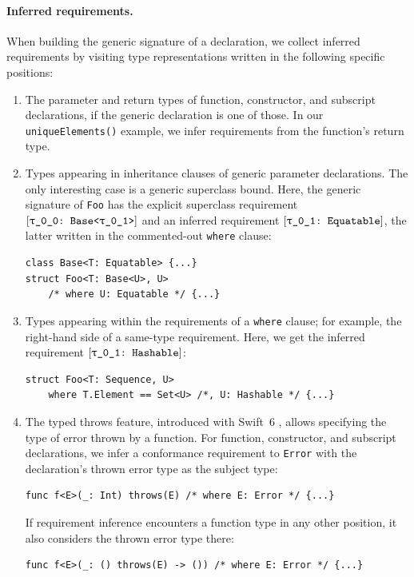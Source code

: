 \documentclass[../generics]{subfiles}
\begin{document}
\paragraph{Inferred requirements.} When building the generic signature of a declaration, we collect inferred requirements by visiting type representations written in the following specific positions:
\begin{enumerate}
\item The parameter and return types of function, constructor, and subscript declarations, if the generic declaration is one of those. In our \texttt{uniqueElements()} example, we infer requirements from the function's return type.

\item Types appearing in inheritance clauses of generic parameter declarations. The only interesting case is a generic superclass bound. Here, the generic signature of \texttt{Foo} has the explicit superclass requirement $\ConfReq{\rT}{Base<\rU>}$ and an inferred requirement $\ConfReq{\rU}{Equatable}$, the latter written in the commented-out \texttt{where} clause:
\begin{Verbatim}
class Base<T: Equatable> {...}
struct Foo<T: Base<U>, U>
    /* where U: Equatable */ {...}
\end{Verbatim}

\item Types appearing within the requirements of a \texttt{where} clause; for example, the right-hand side of a same-type requirement. Here, we get the inferred requirement $\ConfReq{\rU}{Hashable}$:
\begin{Verbatim}
struct Foo<T: Sequence, U>
    where T.Element == Set<U> /*, U: Hashable */ {...}
\end{Verbatim}

\item The typed throws feature, introduced with Swift~6 \cite{se0413}, allows specifying the type of error thrown by a function. For function, constructor, and subscript declarations, we infer a conformance requirement to \texttt{Error} with the declaration's thrown error type as the subject type:
\begin{Verbatim}
func f<E>(_: Int) throws(E) /* where E: Error */ {...}
\end{Verbatim}
If requirement inference encounters a function type in any other position, it also considers the thrown error type there:
\begin{Verbatim}
func f<E>(_: () throws(E) -> ()) /* where E: Error */ {...}
\end{Verbatim}
\end{enumerate}
\end{document}
